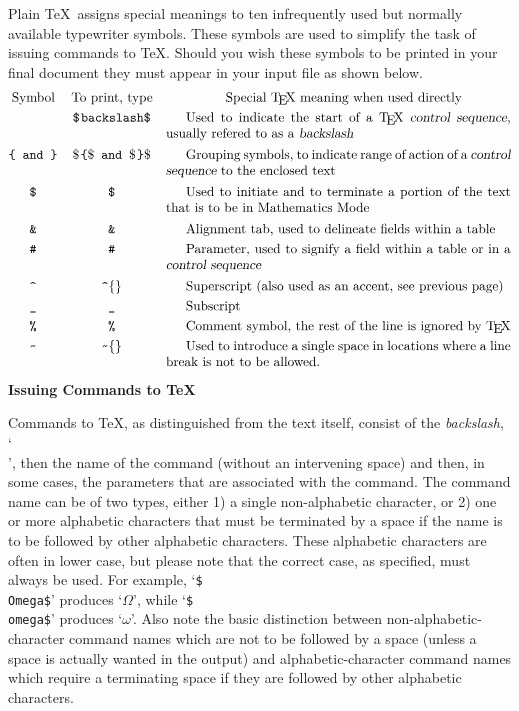 Plain \TeX\ assigns special meanings to ten infrequently used but normally
available typewriter symbols. These symbols are used to simplify the task
of issuing commands to \TeX.  Should you wish these symbols to be printed
in your final document they must appear in your input file as shown below.
$$\vbox{\halign{\tt \hfil #\hfil\quad &\tt \hfil #\hfil\quad &
\vtop{\hsize=26em\strut #\strut}\cr
\rm Symbol&\rm To print, type&\qquad\quad Special \TeX\ meaning when used directly\cr
\noalign{\smallskip}
\\&\$\\backslash\$& Used to indicate the start of a \TeX\ {\sl
control sequence}, usually refered to as a {\sl backslash}\cr
\noalign{\smallskip}
\lbr\ and \rbr& $\$$\\\lbr$\$$ and $\$$\\\rbr$\$$&
Grouping symbols, to indicate range of action of a {\sl control sequence} to the enclosed text\cr
\noalign{\smallskip}
\$&\\{}\$& Used to initiate and to terminate a portion of the text that is to be in Mathematics Mode\cr
\noalign{\smallskip}
\&&\\{}\&& Alignment tab, used to delineate fields within a table \cr
\noalign{\smallskip}
\#&\\{}\#& Parameter, used to signify a field within a table or in a \cs\cr
\noalign{\smallskip}
\sup{}&\\\sup{}$\{\}$&Superscript (also used as an accent, see previous page)\cr
\noalign{\smallskip}
\und&\\{\und}& Subscript\cr
\noalign{\smallskip}
\%&\\\%& Comment symbol, the rest of the line is ignored by \TeX \cr
\noalign{\smallskip}
\til{}&\\\til{}$\{\}$& 
Used to introduce a single space in locations where a line break is not to
be allowed.\cr}}$$
{\bf Issuing Commands to \TeX}

Commands to \TeX, as distinguished from the text itself, consist of the
{\sl backslash}, `{\tt \\}', then the name of the command (without an
intervening space) and then, in some cases, the parameters that are
associated with the command.  The command name can be of two types, either
1) a single non-alphabetic character,
or 2) one or more alphabetic characters that must be
terminated by a space if the name is to be followed by other alphabetic
characters.  These alphabetic characters are often in lower case, but
please note that the correct case, as specified, must always be used.
For example, `{\tt \$\\Omega\$}' produces `$\Omega$', while
`{\tt \$\\omega\$}' produces `$\omega$'. 
Also note the basic distinction between non-alphabetic-character command names which
are not to be followed by a space (unless a space is actually wanted
in the output) and alphabetic-character command names which require a terminating space
if they are followed by other alphabetic characters.

